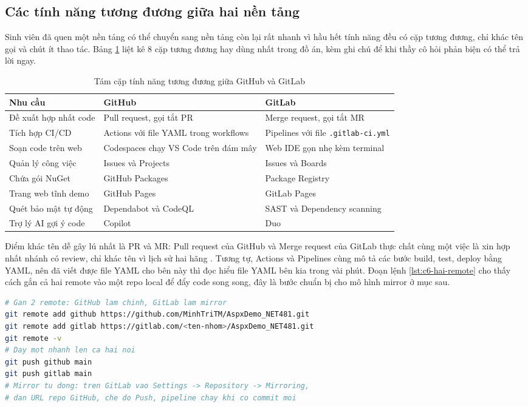\subsection{Các tính năng tương đương giữa hai nền tảng}

Sinh viên đã quen một nền tảng có thể chuyển sang nền tảng còn lại rất nhanh
vì hầu hết tính năng đều có cặp tương đương, chỉ khác tên gọi và chút ít thao tác.
Bảng \ref{tab:c6-tuong-duong} liệt kê 8 cặp tương đương hay dùng nhất trong đồ án,
kèm ghi chú để khi thầy cô hỏi phản biện có thể trả lời ngay.

\begin{table}[H]
\centering
\caption{Tám cặp tính năng tương đương giữa GitHub và GitLab}
\label{tab:c6-tuong-duong}
\begin{tabular}{p{3.2cm}p{5.4cm}p{5.4cm}}
\toprule
Nhu cầu & GitHub & GitLab \\
\midrule
Đề xuất hợp nhất code & Pull request, gọi tắt PR & Merge request, gọi tắt MR \\
Tích hợp CI/CD & Actions với file YAML trong workflows & Pipelines với file \texttt{.gitlab-ci.yml} \\
Soạn code trên web & Codespaces chạy VS Code trên đám mây & Web IDE gọn nhẹ kèm terminal \\
Quản lý công việc & Issues và Projects & Issues và Boards \\
Chứa gói NuGet & GitHub Packages & Package Registry \\
Trang web tĩnh demo & GitHub Pages & GitLab Pages \\
Quét bảo mật tự động & Dependabot và CodeQL & SAST và Dependency scanning \\
Trợ lý AI gợi ý code & Copilot & Duo \\
\bottomrule
\end{tabular}
\end{table}

Điểm khác tên dễ gây lú nhất là PR và MR: Pull request của GitHub
và Merge request của GitLab thực chất cùng một việc là xin hợp nhất nhánh có review,
chỉ khác tên vì lịch sử hai hãng \cite{githubdocs,gitlabdocs}.
Tương tự, Actions và Pipelines cùng mô tả các bước build, test, deploy bằng YAML,
nên đã viết được file YAML cho bên này thì đọc hiểu file YAML bên kia trong vài phút.
Đoạn lệnh \ref{lst:c6-hai-remote} cho thấy cách gắn cả hai remote vào một repo local
để đẩy code song song, đây là bước chuẩn bị cho mô hình mirror ở mục sau.

\begin{lstlisting}[language=bash,caption={Gan ca hai remote GitHub va GitLab vao mot repo},label={lst:c6-hai-remote}]
# Gan 2 remote: GitHub lam chinh, GitLab lam mirror
git remote add github https://github.com/MinhTriTM/AspxDemo_NET481.git
git remote add gitlab https://gitlab.com/<ten-nhom>/AspxDemo_NET481.git
git remote -v
# Day mot nhanh len ca hai noi
git push github main
git push gitlab main
# Mirror tu dong: tren GitLab vao Settings -> Repository -> Mirroring,
# dan URL repo GitHub, che do Push, pipeline chay khi co commit moi
\end{lstlisting}


